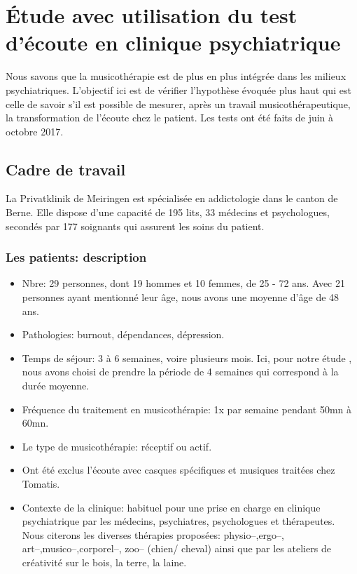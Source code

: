 \chapter[\'Etude en clinique]{\'Etude avec utilisation du test
  d'écoute en clinique psychiatrique}

Nous savons que la musicothérapie est de plus en plus intégrée dans
les milieux psychiatriques.
L'objectif ici est de vérifier l'hypothèse évoquée plus haut qui est celle de
savoir s'il est possible de mesurer, après un travail 
musicothérapeutique, la transformation de l'écoute chez le
patient.
Les tests ont été faits de juin à octobre 2017.

\section{Cadre de travail}

 La Privatklinik
de Meiringen est  spécialisée en
addictologie dans le canton de Berne. Elle dispose d'une capacité de 195 lits, 33 médecins et
psychologues, secondés par 177 soignants qui assurent les soins du
patient.




\subsection{Les patients: description}


 \begin{itemize}
 
 \item Nbre: 29 personnes, dont 19 hommes et 10 femmes, de 25 - 72
   ans. Avec 21 personnes ayant mentionné leur âge, nous avons une
   moyenne d'âge de 48 ans. 

   
 

 \item Pathologies:  burnout, dépendances, dépression.

 \item Temps de séjour: 3 à 6 semaines, voire plusieurs mois. Ici, pour
notre étude , nous avons choisi de prendre la période de 4 semaines
qui correspond à la durée moyenne.
 \item Fréquence du traitement en musicothérapie: 1x par semaine pendant
50mn à 60mn.
 \item Le type de musicothérapie: réceptif ou actif.
 \item Ont été  exclus l'écoute avec casques spécifiques et musiques traitées
   chez Tomatis.
 \item Contexte de la clinique: habituel pour une prise en
charge en clinique psychiatrique 
par les médecins, psychiatres, psychologues et thérapeutes.
Nous citerons les diverses thérapies proposées: physio--,ergo--,
art--,musico--,corporel--, zoo--  (chien/ cheval)  ainsi
que par les  ateliers de créativité sur le bois, la terre, la laine.  

\end{itemize}
